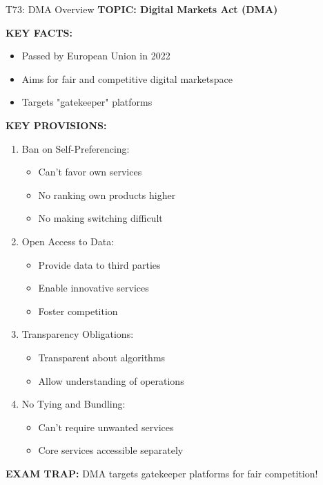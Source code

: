 \documentclass[8pt]{beamer}
\begin{document}
	\begin{frame}{T73: DMA Overview}
		\fontsize{6.5}{7.5}\selectfont
		\textbf{TOPIC: Digital Markets Act (DMA)}
		
		\vspace{0.1cm}
		\textbf{KEY FACTS:}
		\begin{itemize}
			\item Passed by European Union in 2022
			\item Aims for fair and competitive digital marketspace
			\item Targets "gatekeeper" platforms
		\end{itemize}
		
		\vspace{0.1cm}
		\textbf{KEY PROVISIONS:}
		\begin{enumerate}
			\item \textcolor{myblue}{Ban on Self-Preferencing:}
			\begin{itemize}
				\item Can't favor own services
				\item No ranking own products higher
				\item No making switching difficult
			\end{itemize}
			\item \textcolor{myblue}{Open Access to Data:}
			\begin{itemize}
				\item Provide data to third parties
				\item Enable innovative services
				\item Foster competition
			\end{itemize}
			\item \textcolor{myblue}{Transparency Obligations:}
			\begin{itemize}
				\item Transparent about algorithms
				\item Allow understanding of operations
			\end{itemize}
			\item \textcolor{myblue}{No Tying and Bundling:}
			\begin{itemize}
				\item Can't require unwanted services
				\item Core services accessible separately
			\end{itemize}
		\end{enumerate}
		
		\textcolor{myred}{\textbf{EXAM TRAP:}} DMA targets \textcolor{myblue}{gatekeeper platforms} for fair competition!
	\end{frame}
	
\end{document}
